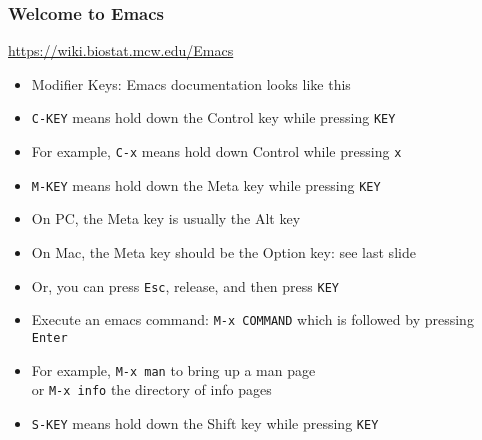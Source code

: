 \documentclass[11pt,pdftex,dvipsnames,usenames,helvetica]{beamer}
\begin{document}
\begin{frame}[fragile]
\frametitle{Welcome to Emacs}
\url{https://wiki.biostat.mcw.edu/Emacs}
\begin{itemize}
\item Modifier Keys: Emacs documentation looks like this
\item {\tt C-KEY} means hold down the Control key while pressing {\tt KEY}
\item For example, {\tt C-x} means hold down Control while pressing {\tt x}
\item {\tt M-KEY} means hold down the Meta key while pressing {\tt KEY}
\item On PC, the Meta key is usually the Alt key 
\item On Mac, the Meta key should be the Option key: see last slide
\item Or, you can press {\tt Esc}, release,
  and then press {\tt KEY}
\item Execute an emacs command: {\tt M-x COMMAND} which is followed by
  pressing {\tt Enter}
\item For example, {\tt M-x man} to bring up a man page\\
 or {\tt M-x info} the directory of info pages
\item {\tt S-KEY} means hold down the Shift key while pressing {\tt KEY}
\end{itemize}

\end{frame}
\end{document}
